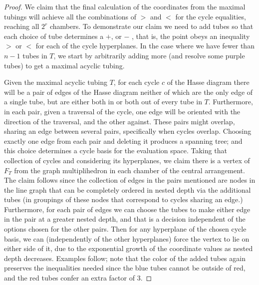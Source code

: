 \documentclass{article}
\begin{document}
\begin{proof}
We claim that the final calculation of the coordinates from the maximal tubings will achieve all the combinations of $>$ and $<$ for the cycle equalities, reaching all $2^r$ chambers. To demonstrate our claim we need to add  tubes so that each choice of tube determines a $+$, or  $-$ , that is, the point obeys an inequality $>$ or $<$  for each of the cycle hyperplanes.   In the case where we have fewer than $n-1$ tubes in $T$, we start by arbitrarily adding more (and resolve some purple tubes) to get a maximal acyclic tubing.

 Given the maximal acyclic tubing $T$,  for each cycle $c$ of the Hasse diagram there will be a pair of edges of the Hasse diagram neither of which are the only edge of a single tube, but are either both in or both out of every tube in $T.$ Furthermore, in each pair, given a traversal of the cycle, one edge will be oriented with the direction of the traversal, and the other against. These pairs might overlap, sharing an edge between several pairs, specifically when cycles overlap. Choosing exactly one edge from each pair and deleting it produces a spanning tree; and this choice determines a cycle basis for the evaluation space. Taking that collection of cycles and considering its hyperplanes, we claim there is a vertex of $F_T$ from the graph multiplihedron in each chamber of the central arrangement. The claim follows since the collection of edges in the pairs mentioned are nodes in the line graph that can be completely ordered in nested depth via the additional tubes (in groupings of these nodes that correspond to cycles sharing an edge.) Furthermore, for each pair of edges we can choose the tubes to make either edge in the pair at a greater nested depth, and that is a decision independent of the options chosen for the other pairs.  Then for any hyperplane of the chosen cycle basis, we can (independently of the other hyperplanes) force the vertex to lie on either side of it, due to the exponential growth of the coordinate values as nested depth decreases. Examples follow; note that the color of the added tubes again preserves the inequalities needed since the blue tubes cannot be outside of red, and the red tubes confer an extra factor of 3. 
   \end{proof}  
 



\end{document}
